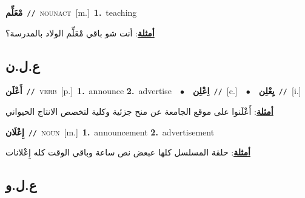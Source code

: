 \documentclass[10pt,a4paper,twoside]{article} %
\begin{document}
\begin{multicols}{2}
{\setlength\topsep{0pt}\textbf{\foreignlanguage{arabic}{مْعَلِّم}}\ {\color{gray}\texttt{//}\color{black}}\ \textsc{noun\textunderscore act}\ [m.]\ \textbf{1.}~teaching\  \begin{flushright}\color{gray}\foreignlanguage{arabic}{\textbf{\underline{\foreignlanguage{arabic}{أمثلة}}}: أنت شو باقي مْعَلِّم الولاد بالمدرسة؟}\end{flushright}\color{black}} \vspace{2mm}

\vspace{-3mm}
\subsection*{\color{blue}\foreignlanguage{arabic}{ع.ل.ن}\color{blue}{}} 

{\setlength\topsep{0pt}\textbf{\foreignlanguage{arabic}{أَعْلَن}}\ {\color{gray}\texttt{//}\color{black}}\ \textsc{verb}\ [p.]\ \textbf{1.}~announce  \textbf{2.}~advertise\ \ $\bullet$\ \ \setlength\topsep{0pt}\textbf{\foreignlanguage{arabic}{اِعْلِن}}\ {\color{gray}\texttt{//}\color{black}}\ [c.]\ \ $\bullet$\ \ \setlength\topsep{0pt}\textbf{\foreignlanguage{arabic}{يِعْلِن}}\ {\color{gray}\texttt{//}\color{black}}\ [i.]\  \begin{flushright}\color{gray}\foreignlanguage{arabic}{\textbf{\underline{\foreignlanguage{arabic}{أمثلة}}}: أَعْلَنوا على موقع الجامعة عن منح جزئية وكلية لتخصص الانتاج الحيواني}\end{flushright}\color{black}} \vspace{2mm}

{\setlength\topsep{0pt}\textbf{\foreignlanguage{arabic}{إِعْلَان}}\ {\color{gray}\texttt{//}\color{black}}\ \textsc{noun}\ [m.]\ \textbf{1.}~announcement  \textbf{2.}~advertisement\  \begin{flushright}\color{gray}\foreignlanguage{arabic}{\textbf{\underline{\foreignlanguage{arabic}{أمثلة}}}: حلقة المسلسل كلها عبعض نص ساعة وباقي الوقت كله إِعْلانات}\end{flushright}\color{black}} \vspace{2mm}

\vspace{-3mm}
\subsection*{\color{blue}\foreignlanguage{arabic}{ع.ل.و}\color{blue}{}} 


\end{multicols}
\end{document}
